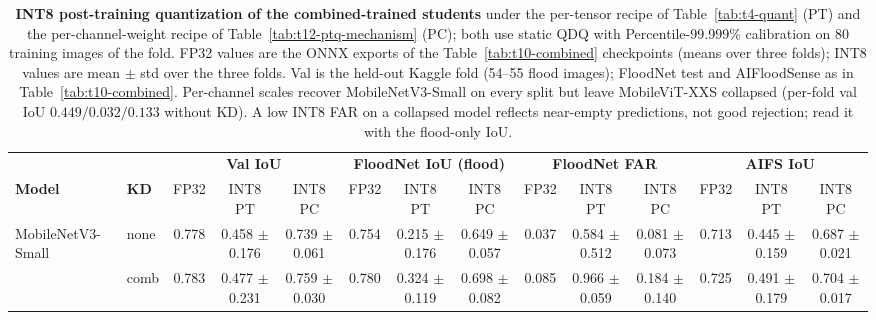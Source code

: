 \begin{table}[ht]
\centering
\caption{\textbf{INT8 post-training quantization of the combined-trained students} under the per-tensor recipe of Table~\ref{tab:t4-quant} (PT) and the per-channel-weight recipe of Table~\ref{tab:t12-ptq-mechanism} (PC); both use static QDQ with Percentile-99.999\% calibration on 80 training images of the fold. FP32 values are the ONNX exports of the Table~\ref{tab:t10-combined} checkpoints (means over three folds); INT8 values are mean $\pm$ std over the three folds. Val is the held-out Kaggle fold (54--55 flood images); FloodNet test and AIFloodSense as in Table~\ref{tab:t10-combined}. Per-channel scales recover MobileNetV3-Small on every split but leave MobileViT-XXS collapsed (per-fold val IoU $0.449/0.032/0.133$ without KD). A low INT8 FAR on a collapsed model reflects near-empty predictions, not good rejection; read it with the flood-only IoU.}
\label{tab:t11-combined-int8}
\small
\setlength{\tabcolsep}{2.2pt}
\begin{adjustbox}{max width=\textwidth}
\begin{tabular}{llccc@{\hskip 6pt}ccc@{\hskip 6pt}ccc@{\hskip 6pt}ccc}
\toprule
& & \multicolumn{3}{c}{\textbf{Val IoU}} & \multicolumn{3}{c}{\textbf{FloodNet IoU (flood)}} & \multicolumn{3}{c}{\textbf{FloodNet FAR}} & \multicolumn{3}{c}{\textbf{AIFS IoU}} \\
\cmidrule(lr){3-5}\cmidrule(lr){6-8}\cmidrule(lr){9-11}\cmidrule(lr){12-14}
\textbf{Model} & \textbf{KD} & FP32 & INT8 PT & INT8 PC & FP32 & INT8 PT & INT8 PC & FP32 & INT8 PT & INT8 PC & FP32 & INT8 PT & INT8 PC \\
\midrule
MobileNetV3-Small  & none & 0.778 & 0.458 $\pm$ 0.176 & 0.739 $\pm$ 0.061 & 0.754 & 0.215 $\pm$ 0.176 & 0.649 $\pm$ 0.057 & 0.037 & 0.584 $\pm$ 0.512 & 0.081 $\pm$ 0.073 & 0.713 & 0.445 $\pm$ 0.159 & 0.687 $\pm$ 0.021 \\
                   & comb & 0.783 & 0.477 $\pm$ 0.231 & 0.759 $\pm$ 0.030 & 0.780 & 0.324 $\pm$ 0.119 & 0.698 $\pm$ 0.082 & 0.085 & 0.966 $\pm$ 0.059 & 0.184 $\pm$ 0.140 & 0.725 & 0.491 $\pm$ 0.179 & 0.704 $\pm$ 0.017 \\

\end{tabular}
\end{adjustbox}
\end{table}
